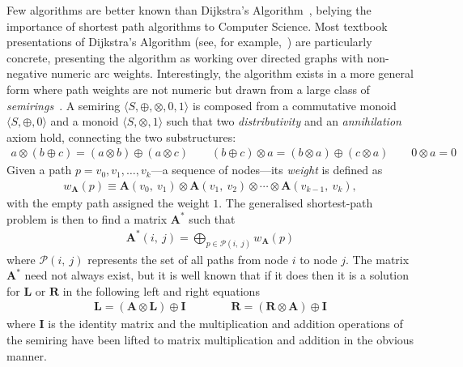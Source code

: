 Few algorithms are better known than Dijkstra's Algorithm~\cite{dijkstra:note:1959}, belying the importance of shortest path algorithms to Computer Science.
Most textbook presentations of Dijkstra's Algorithm (see, for example,~\cite[Chapter 24]{clrs}) are particularly concrete, presenting the algorithm as working over directed graphs with non-negative numeric arc weights.
Interestingly, the algorithm exists in a more general form where path weights are not numeric but drawn from a large class of \emph{semirings}~\cite{gondran_graphs_2008, mohri:semiring:2002}.
A semiring $\langle S, \oplus, \otimes, 0, 1 \rangle$ is composed from a commutative monoid $\langle S, \oplus, 0\rangle$ and a monoid $\langle S, \otimes, 1\rangle$ such that two \emph{distributivity} and an \emph{annihilation} axiom hold, connecting the two substructures:
\begin{gather*}
a\otimes (b \oplus c) = (a\otimes b) \oplus (a\otimes c) \qquad
(b \oplus c) \otimes a = (b\otimes a) \oplus (c\otimes a) \qquad
0 \otimes a = 0
\end{gather*}
\noindent
Given a path $p = v_0, v_1, \ldots, v_k$---a sequence of nodes---its \emph{weight} is defined as
\begin{gather*}
    w_{\mathbf{A}}(p)
    \equiv
    \mathbf{A}(v_0,\ v_1)
    \otimes \mathbf{A}(v_1,\ v_2)
    \otimes \cdots
    \otimes \mathbf{A}(v_{k-1},\ v_k),
\end{gather*}
with the empty path assigned the weight $1$.
The generalised shortest-path problem is then to find a matrix $\mathbf{A}^*$ such that
\begin{gather*}
\label{eq:global}
\mathbf{A}^*(i,\ j) = \displaystyle\bigoplus_{p \in \mathcal{P}(i,\ j)} w_{\mathbf{A}}(p)
\end{gather*}
where $\mathcal{P}(i,\ j)$ represents the set of all paths from node $i$ to node $j$.
The matrix $\mathbf{A}^*$ need not always exist, but it is well known that if it does then it is a solution for $\mathbf{L}$ or $\mathbf{R}$ in the following left and right equations
\begin{gather*}
\mathbf{L} = (\mathbf{A} \otimes \mathbf{L}) \oplus \mathbf{I} \qquad\qquad
\mathbf{R} = (\mathbf{R} \otimes \mathbf{A}) \oplus \mathbf{I}
\end{gather*}
where $\mathbf{I}$ is the identity matrix and the multiplication and addition operations of the semiring have been lifted to matrix multiplication and addition in the obvious manner.

